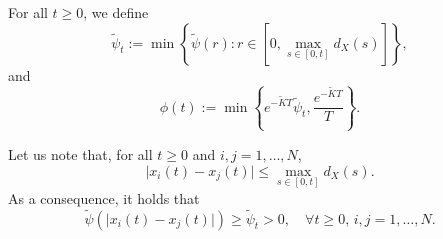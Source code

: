 \documentclass[a4paper,11pt,oneside]{article}
\begin{document}
\begin{defn}
	For all $t\geq 0$, we define
	\begin{equation}\label{psit}
		\tilde\psi_{t}:=\min\left\{\tilde\psi(r):r\in \left[0,\max_{s\in [0,t]}d_X(s)\right]\right\},
	\end{equation}
	and
	\begin{equation}\label{defphi}
		\phi(t):=\min\left\{e^{-\tilde KT}\tilde\psi_{t},\frac{e^{-\tilde KT}}{T}\right\}.
	\end{equation}
\end{defn}
\begin{oss}
	Let us note that, for all $t\geq 0$ and $i,j=1,\dots,N$, 
	$$\lvert x_{i}(t)-x_{j}(t)\rvert\leq \max_{s\in [0,t]}d_X(s).$$
	As a consequence, it holds that 
	\begin{equation}\label{infbou}
		\tilde\psi (\lvert x_{i}(t)-x_{j}(t)\rvert)\geq \tilde\psi_{t}>0, \quad \forall t\geq 0,\,i,j=1,\dots,N.
	\end{equation}
\end{oss}
\end{document}
